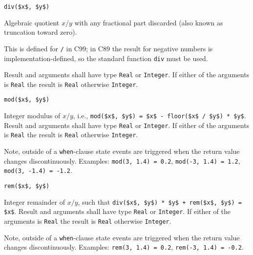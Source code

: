 \begin{operatordefinition}[div]
\begin{synopsis}\begin{lstlisting}
div($x$, $y$)
\end{lstlisting}\end{synopsis}
\begin{semantics}
Algebraic quotient $x / y$ with any fractional part discarded (also known as truncation toward zero).
\begin{nonnormative}
This is defined for \lstinline!/! in C99; in C89 the result for negative numbers is implementation-defined, so the standard function \lstinline[language=C]!div! must be used.
\end{nonnormative}
Result and arguments shall have type \lstinline!Real! or \lstinline!Integer!.
If either of the arguments is \lstinline!Real! the result is \lstinline!Real! otherwise \lstinline!Integer!.
\end{semantics}
\end{operatordefinition}

\begin{operatordefinition}[mod]
\begin{synopsis}\begin{lstlisting}
mod($x$, $y$)
\end{lstlisting}\end{synopsis}
\begin{semantics}
Integer modulus of $x / y$, i.e., \lstinline!mod($x$, $y$) = $x$ - floor($x$ / $y$) * $y$!.
Result and arguments shall have type \lstinline!Real! or \lstinline!Integer!.
If either of the arguments is \lstinline!Real! the result is \lstinline!Real! otherwise \lstinline!Integer!.
\begin{nonnormative}
Note, outside of a \lstinline!when!-clause state events are triggered when the return value changes discontinuously.
Examples: \lstinline!mod(3, 1.4) = 0.2!, \lstinline!mod(-3, 1.4) = 1.2!, \lstinline!mod(3, -1.4) = -1.2!.
\end{nonnormative}
\end{semantics}
\end{operatordefinition}

\begin{operatordefinition}[rem]
\begin{synopsis}\begin{lstlisting}
rem($x$, $y$)
\end{lstlisting}\end{synopsis}
\begin{semantics}
Integer remainder of $x / y$, such that \lstinline!div($x$, $y$) * $y$ + rem($x$, $y$) = $x$!.
Result and arguments shall have type \lstinline!Real! or \lstinline!Integer!.
If either of the arguments is \lstinline!Real! the result is \lstinline!Real! otherwise \lstinline!Integer!.
\begin{nonnormative}
Note, outside of a \lstinline!when!-clause state events are triggered when the return value changes discontinuously.
Examples: \lstinline!rem(3, 1.4) = 0.2!, \lstinline!rem(-3, 1.4) = -0.2!.
\end{nonnormative}
\end{semantics}
\end{operatordefinition}

